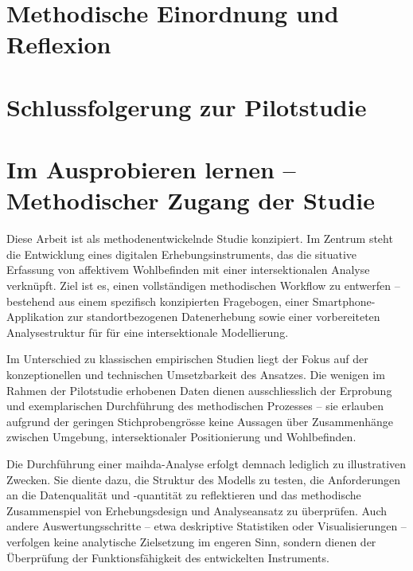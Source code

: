 \section{Methodische Einordnung und Reflexion}

\section{Schlussfolgerung zur Pilotstudie}



\section{Im Ausprobieren lernen -- Methodischer Zugang der Studie} \label{sec:methodenentwickelnd}

Diese Arbeit ist als methodenentwickelnde Studie konzipiert. Im Zentrum steht die Entwicklung eines digitalen Erhebungsinstruments, das die situative Erfassung von affektivem Wohlbefinden mit einer intersektionalen Analyse verknüpft. Ziel ist es, einen vollständigen methodischen Workflow zu entwerfen -- bestehend aus einem spezifisch konzipierten Fragebogen, einer Smartphone-Applikation zur standortbezogenen Datenerhebung sowie einer vorbereiteten Analysestruktur für für eine intersektionale Modellierung.

Im Unterschied zu klassischen empirischen Studien liegt der Fokus auf der konzeptionellen und technischen Umsetzbarkeit des Ansatzes. Die wenigen im Rahmen der Pilotstudie erhobenen Daten dienen ausschliesslich der Erprobung und exemplarischen Durchführung des methodischen Prozesses -- sie erlauben aufgrund der geringen Stichprobengrösse keine  Aussagen über Zusammenhänge zwischen Umgebung, intersektionaler Positionierung und Wohlbefinden.

Die Durchführung einer \acrshort{maihda}-Analyse erfolgt demnach lediglich zu illustrativen Zwecken. Sie diente dazu, die Struktur des Modells zu testen, die Anforderungen an die Datenqualität und -quantität zu reflektieren und das methodische Zusammenspiel von Erhebungsdesign und Analyseansatz zu überprüfen. Auch andere Auswertungsschritte -- etwa deskriptive Statistiken oder Visualisierungen -- verfolgen keine analytische Zielsetzung im engeren Sinn, sondern dienen der Überprüfung der Funktionsfähigkeit des entwickelten Instruments.

